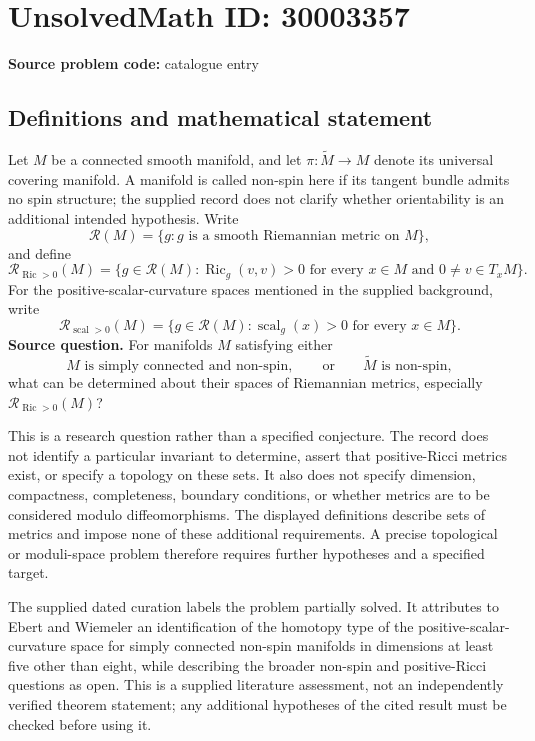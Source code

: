 \documentclass[11pt]{article}
\begin{document}
\section*{UnsolvedMath ID: 30003357}
\textbf{Source problem code:} catalogue entry
\subsection{Definitions and mathematical statement}
Let \(M\) be a connected smooth manifold, and let \(\pi\colon\widetilde M\to M\) denote its universal covering manifold. A manifold is called non-spin here if its tangent bundle admits no spin structure; the supplied record does not clarify whether orientability is an additional intended hypothesis. Write
\[
\mathcal R(M)=\{g:g\text{ is a smooth Riemannian metric on }M\},
\]
and define
\[
\mathcal R_{\operatorname{Ric}>0}(M)
=\{g\in\mathcal R(M):\operatorname{Ric}_g(v,v)>0
\text{ for every }x\in M\text{ and }0\ne v\in T_xM\}.
\]
For the positive-scalar-curvature spaces mentioned in the supplied background, write
\[
\mathcal R_{\operatorname{scal}>0}(M)
=\{g\in\mathcal R(M):\operatorname{scal}_g(x)>0
\text{ for every }x\in M\}.
\]
\textbf{Source question.} For manifolds \(M\) satisfying either
\[
M\text{ is simply connected and non-spin},
\qquad\text{or}\qquad
\widetilde M\text{ is non-spin},
\]
what can be determined about their spaces of Riemannian metrics, especially \(\mathcal R_{\operatorname{Ric}>0}(M)\)?

This is a research question rather than a specified conjecture. The record does not identify a particular invariant to determine, assert that positive-Ricci metrics exist, or specify a topology on these sets. It also does not specify dimension, compactness, completeness, boundary conditions, or whether metrics are to be considered modulo diffeomorphisms. The displayed definitions describe sets of metrics and impose none of these additional requirements. A precise topological or moduli-space problem therefore requires further hypotheses and a specified target.

The supplied dated curation labels the problem partially solved. It attributes to Ebert and Wiemeler an identification of the homotopy type of the positive-scalar-curvature space for simply connected non-spin manifolds in dimensions at least five other than eight, while describing the broader non-spin and positive-Ricci questions as open. This is a supplied literature assessment, not an independently verified theorem statement; any additional hypotheses of the cited result must be checked before using it.
\end{document}

